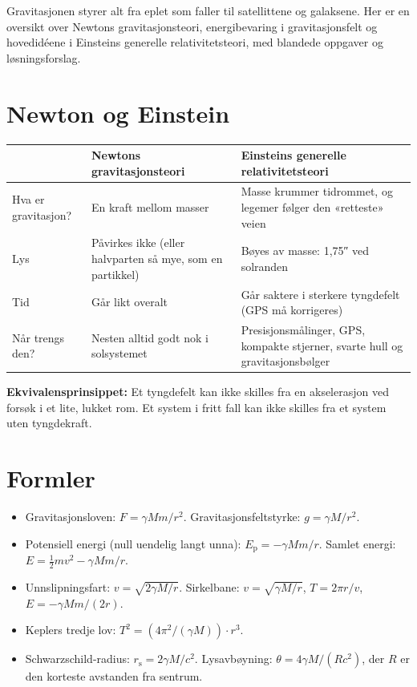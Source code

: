 \documentclass[11pt]{article}
\begin{document}

Gravitasjonen styrer alt fra eplet som faller til satellittene og galaksene. Her er en oversikt over Newtons gravitasjonsteori, energibevaring i gravitasjonsfelt og hovedidéene i Einsteins generelle relativitetsteori, med blandede oppgaver og løsningsforslag.

\section*{Newton og Einstein}

\begin{center}\small
\begin{tabularx}{\linewidth}{YYY}
\toprule
\textbf{} & \textbf{Newtons gravitasjonsteori} & \textbf{Einsteins generelle relativitetsteori} \\
\midrule
Hva er gravitasjon? & En kraft mellom masser & Masse krummer tidrommet, og legemer følger den «retteste» veien \\
Lys & Påvirkes ikke (eller halvparten så mye, som en partikkel) & Bøyes av masse: 1,75″ ved solranden \\
Tid & Går likt overalt & Går saktere i sterkere tyngdefelt (GPS må korrigeres) \\
Når trengs den? & Nesten alltid godt nok i solsystemet & Presisjonsmålinger, GPS, kompakte stjerner, svarte hull og gravitasjonsbølger \\
\bottomrule
\end{tabularx}
\end{center}

\textbf{Ekvivalensprinsippet:} Et tyngdefelt kan ikke skilles fra en akselerasjon ved forsøk i et lite, lukket rom. Et system i fritt fall kan ikke skilles fra et system uten tyngdekraft.

\section*{Formler}

\begin{itemize}
\item Gravitasjonsloven: $F = γMm/r^{2}$. Gravitasjonsfeltstyrke: $g = γM/r^{2}$.
\item Potensiell energi (null uendelig langt unna): $E_{\mathrm{p}} = -γMm/r$. Samlet energi: $E = \tfrac{1}{2}mv^{2} - γMm/r$.
\item Unnslipningsfart: $v = \sqrt{2γM/r}$. Sirkelbane: $v = \sqrt{γM/r}$, $T = 2πr/v$, $E = -γMm/(2r)$.
\item Keplers tredje lov: $T^{2} = (4π^{2}/(γM)) \cdot r^{3}$.
\item Schwarzschild-radius: $r_{\mathrm{s}} = 2γM/c^{2}$. Lysavbøyning: $θ = 4γM/(Rc^{2})$, der $R$ er den korteste avstanden fra sentrum.
\end{itemize}
\end{document}
